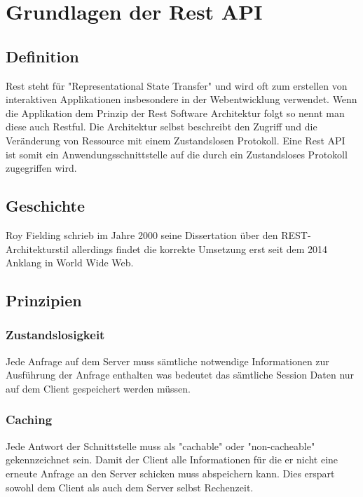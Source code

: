 \chapter{Grundlagen der Rest API}
\bauer
		
		\section{Definition}
			Rest steht für "Representational State Transfer" und wird oft zum erstellen von interaktiven Applikationen insbesondere in der Webentwicklung verwendet. Wenn die Applikation dem Prinzip der Rest Software Architektur folgt so nennt man diese auch Restful. Die Architektur selbst beschreibt den Zugriff und die Veränderung von Ressource mit einem Zustandslosen Protokoll. Eine Rest API ist somit ein Anwendungsschnittstelle auf die durch ein Zustandsloses Protokoll zugegriffen wird.
			
		 \section{Geschichte}
		 	Roy Fielding schrieb im Jahre 2000 seine Dissertation über den REST-Architekturstil allerdings findet die korrekte Umsetzung erst seit dem 2014 Anklang in World Wide Web.
		 	
		 \section{Prinzipien}
		 				 	
		 	\subsection{Zustandslosigkeit}
		 		Jede Anfrage auf dem Server muss sämtliche notwendige Informationen zur Ausführung der Anfrage enthalten was bedeutet das sämtliche Session Daten nur auf dem Client gespeichert werden müssen.
		 	
		 	\subsection{Caching}
		 		Jede Antwort der Schnittstelle muss als "cachable" oder "non-cacheable" gekennzeichnet sein. Damit der Client alle Informationen für die er nicht eine erneute Anfrage an den Server schicken muss abspeichern kann. Dies erspart sowohl dem Client als auch dem Server selbst Rechenzeit.
		 	
